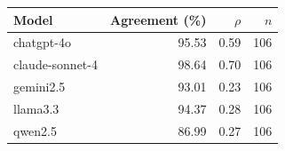 \begin{tabular}{lrrr}
\toprule
Model & Agreement (\%) & $\rho$ & $n$ \\
\midrule
chatgpt-4o & 95.53 & 0.59 & 106 \\
claude-sonnet-4 & 98.64 & 0.70 & 106 \\
gemini2.5 & 93.01 & 0.23 & 106 \\
llama3.3 & 94.37 & 0.28 & 106 \\
qwen2.5 & 86.99 & 0.27 & 106 \\
\bottomrule
\end{tabular}
